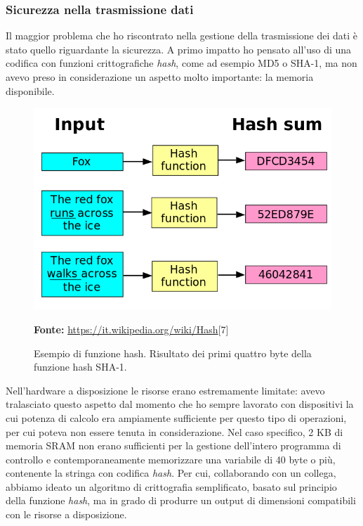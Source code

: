 \subsubsection{Sicurezza nella trasmissione dati}
Il maggior problema che ho riscontrato nella gestione della trasmissione dei dati è stato quello riguardante la sicurezza. A primo impatto ho pensato all'uso di una codifica con funzioni crittografiche \textit{hash}, come ad esempio MD5 o SHA-1, ma non avevo preso in considerazione un aspetto molto importante: la memoria disponibile. 

\begin{figure}[H]
	\begin{center}
	\includegraphics[scale=0.4]{immagini/hash.png}
	\caption{Esempio di funzione hash. Risultato dei primi quattro byte della funzione hash SHA-1.}
	\small{\textbf{Fonte:} \url{https://it.wikipedia.org/wiki/Hash}[7]}
	\end{center}
\end{figure}

Nell'hardware a disposizione le risorse erano estremamente limitate: avevo tralasciato questo aspetto dal momento che ho sempre lavorato con dispositivi la cui potenza di calcolo era ampiamente sufficiente per questo tipo di operazioni, per cui poteva non essere tenuta in considerazione. Nel caso specifico, 2 KB di memoria SRAM non erano sufficienti per la gestione dell'intero programma di controllo e contemporaneamente memorizzare una variabile di 40 byte o più, contenente la stringa con codifica \textit{hash}. Per cui, collaborando con un collega, abbiamo ideato un algoritmo di crittografia semplificato, basato sul principio della funzione \textit{hash}, ma in grado di produrre un output di dimensioni compatibili con le risorse a disposizione.


